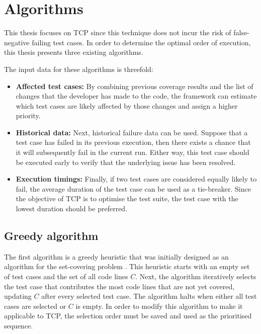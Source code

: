 \section{Algorithms}
\noindent This thesis focuses on TCP since this technique does not incur the risk of false-negative failing test cases. In order to determine the optimal order of execution, this thesis presents three existing algorithms.\\

\mbox{}

\noindent The input data for these algorithms is threefold:\\

\begin{itemize}[leftmargin=1em]
\item \textbf{Affected test cases:} By combining previous coverage results and the list of changes that the developer has made to the code, the framework can estimate which test cases are likely affected by those changes and assign a higher priority.

\item \textbf{Historical data:} Next, historical failure data can be used. Suppose that a test case has failed in its previous execution, then there exists a chance that it will subsequently fail in the current run. Either way, this test case should be executed early to verify that the underlying issue has been resolved.

\item \textbf{Execution timings:} Finally, if two test cases are considered equally likely to fail, the average duration of the test case can be used as a tie-breaker. Since the objective of TCP is to optimise the test suite, the test case with the lowest duration should be preferred.
\end{itemize}

\subsection{Greedy algorithm}
\noindent The first algorithm is a greedy heuristic that was initially designed as an algorithm for the set-covering problem \cite{evaluationoftestsuiteminimization}. This heuristic starts with an empty set of test cases and the set of all code lines $C$. Next, the algorithm iteratively selects the test case that contributes the most code lines that are not yet covered, updating $C$ after every selected test case. The algorithm halts when either all test cases are selected or $C$ is empty. In order to modify this algorithm to make it applicable to TCP, the selection order must be saved and used as the prioritised sequence.

